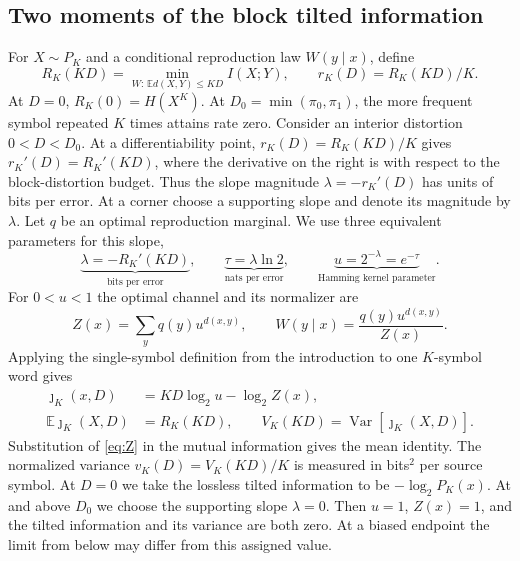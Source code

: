 \documentclass[11pt,letterpaper]{article}
\theoremstyle{definition}
\newcommand{\E}{\mathbb E}
\newcommand{\Var}{\operatorname{Var}}
\newcommand{\jj}{\jmath}
\begin{document}
\subsection{Two moments of the block tilted information}
For $X\sim P_K$ and a conditional reproduction law $W(y\mid x)$, define
\begin{equation}
 R_K(KD)=\min_{W:\,\E d(X,Y)\le KD} I(X;Y),\qquad
 r_K(D)=R_K(KD)/K .                                           \label{eq:rd}
\end{equation}
At $D=0$, $R_K(0)=H(X^K)$. At $D_0=\min(\pi_0,\pi_1)$, the more frequent symbol repeated $K$ times attains rate zero. Consider an interior distortion $0<D<D_0$. At a differentiability point, $r_K(D)=R_K(KD)/K$ gives $r_K'(D)=R_K'(KD)$, where the derivative on the right is with respect to the block-distortion budget. Thus the slope magnitude $\lambda=-r_K'(D)$ has units of bits per error. At a corner choose a supporting slope and denote its magnitude by $\lambda$. Let $q$ be an optimal reproduction marginal. We use three equivalent parameters for this slope,
\[
 \underbrace{\lambda=-R_K'(KD)}_{\text{bits per error}},\qquad
 \underbrace{\tau=\lambda\ln 2}_{\text{nats per error}},\qquad
 \underbrace{u=2^{-\lambda}=e^{-\tau}}_{\text{Hamming kernel parameter}}.
\] For $0<u<1$ the optimal channel and its normalizer are
\begin{equation}
 Z(x)=\sum_y q(y)u^{d(x,y)},\qquad W(y\mid x)=\frac{q(y)u^{d(x,y)}}{Z(x)}.
 \label{eq:Z}
\end{equation}
Applying the single-symbol definition from the introduction to one $K$-symbol word gives
\begin{equation}
 \begin{aligned}\jj_K(x,D)&=KD\log_2u-\log_2 Z(x),\\
 \E\jj_K(X,D)&=R_K(KD),\qquad V_K(KD)=\Var[\jj_K(X,D)].\end{aligned}        \label{eq:j}
\end{equation}
Substitution of \eqref{eq:Z} in the mutual information gives the mean identity. The normalized variance $v_K(D)=V_K(KD)/K$ is measured in bits$^2$ per source symbol. At $D=0$ we take the lossless tilted information to be $-\log_2 P_K(x)$. At and above $D_0$ we choose the supporting slope $\lambda=0$. Then $u=1$, $Z(x)=1$, and the tilted information and its variance are both zero. At a biased endpoint the limit from below may differ from this assigned value.
\end{document}
